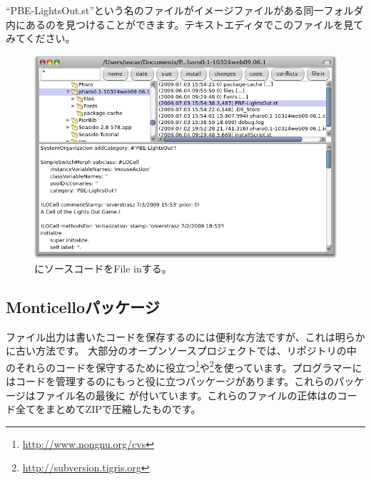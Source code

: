 \documentclass[a4paper,10pt,twoside]{book}
\begin{document}
``PBE-LightsOut.st''という名のファイルがイメージファイルがある同一フォルダ内にあるのを見つけることができます。テキストエディタでこのファイルを見てみてください。


\begin{figure}[ht]
\centerline {\includegraphics[width=\textwidth]{FileIn}}
\caption{\pharo にソースコードをFile inする。
}
\end{figure}

\subsection{Monticelloパッケージ}
ファイル出力は書いたコードを保存するのには便利な方法ですが、これは明らかに古い方法です。
大部分のオープンソースプロジェクトでは、リポジトリの中のそれらのコードを保守するために役立つ\footnote{\url{http://www.nongnu.org/cvs}}や\footnote{\url{http://subversion.tigris.org}}を使っています。\pharo プログラマーにはコードを管理するのにもっと役に立つパッケージがあります。これらのパッケージはファイル名の最後に が付いています。これらのファイルの正体はのコード全てをまとめてZIPで圧縮したものです。
\end{document}
